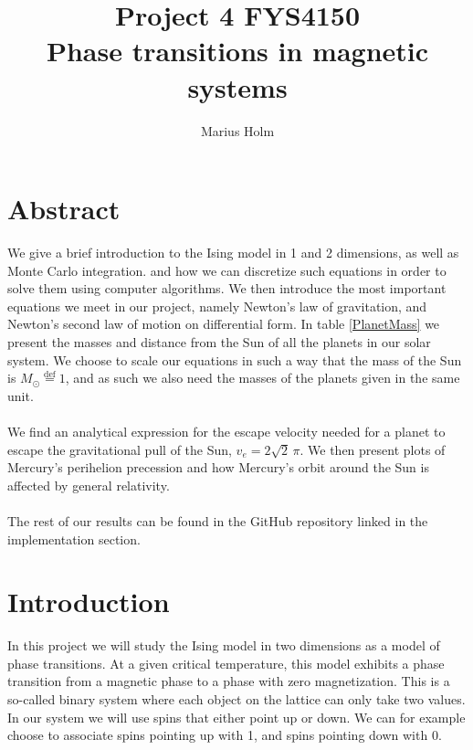 \documentclass[a4paper, fontsize=11pt]{article}
\begin{document}
\title{Project 4 FYS4150 \\ Phase transitions in magnetic systems}
\author{Marius Holm}

\maketitle


\section{Abstract}
We give a brief introduction to the Ising model in 1 and 2 dimensions, as well as Monte Carlo integration. and how we can discretize such equations in order to solve them using computer algorithms. We then introduce the most important equations we meet in our project, namely Newton's law of gravitation, and Newton's second law of motion on differential form. In table \ref{PlanetMass} we present the masses and distance from the Sun of all the planets in our solar system. We choose to scale our equations in such a way that the mass of the Sun is $M_{\odot}\overset{\text{def}}{=} 1$, and as such we also need the masses of the planets given in the same unit.


\paragraph{}
We find an analytical expression for the escape velocity needed for a planet to escape the gravitational pull of the Sun, $v_{e} = 2\sqrt{2} \, \pi$. We then present plots of Mercury's perihelion precession and how Mercury's orbit around the Sun is affected by general relativity.


\paragraph{}
The rest of our results can be found in the GitHub repository linked in the implementation section. 

\section{Introduction}
In this project we will study the Ising model in two dimensions as a model of phase transitions. At a given critical temperature, this model exhibits a phase transition from a magnetic phase to a phase with zero magnetization. This is a so-called binary system where each object on the lattice can only take two values. In our system we will use spins that either point up or down. We can for example choose to associate spins pointing up with 1, and spins pointing down with 0. 
\end{document}
